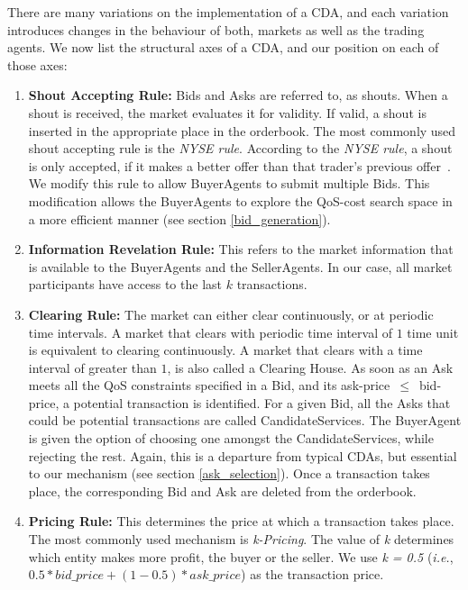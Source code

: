\documentclass[10pt,journal,compsoc]{IEEEtran}
\begin{document}
There are many variations on the implementation of a CDA, and each variation introduces changes in the behaviour of both, markets as well as the trading agents. We now list the structural axes of a CDA, and our position on each of those axes:
\begin{enumerate}
	\item \textbf{Shout Accepting Rule:} Bids and Asks are referred to, as shouts. When a shout is received, the market evaluates it for validity. If valid, a shout is inserted in the appropriate place in the orderbook. The most commonly used shout accepting rule is the \textit{NYSE rule}. According to the \textit{NYSE rule}, a shout is only accepted, if it makes a better offer than that trader's previous offer~\cite{Vytelingum2006Structure}. We modify this rule to allow BuyerAgents to submit multiple Bids. This modification allows the BuyerAgents to explore the QoS-cost search space in a more efficient manner (see section \ref{bid_generation}). 

	\item \textbf{Information Revelation Rule:} This refers to the market information that is available to the BuyerAgents and the SellerAgents. In our case, all market participants have access to the last $k$ transactions.	
	
	\item \textbf{Clearing Rule:} The market can either clear continuously, or at periodic time intervals. A market that clears with periodic time interval of $1$ time unit is equivalent to clearing continuously. A market that clears with a time interval of greater than $1$, is also called a Clearing House. As soon as an Ask meets all the QoS constraints specified in a Bid, and its ask-price~$\leq$~bid-price, a potential transaction is identified. For a given Bid, all the Asks that could be potential transactions are called CandidateServices. The BuyerAgent is given the option of choosing one amongst the CandidateServices, while rejecting the rest. Again, this is a departure from typical CDAs, but essential to our mechanism (see section \ref{ask_selection}). Once a transaction takes place, the corresponding Bid and Ask are deleted from the orderbook.
	
	\item \textbf{Pricing Rule:} This determines the price at which a transaction takes place. The most commonly used mechanism is \textit{k-Pricing}. The value of \textit{k} determines which entity makes more profit, the buyer or the seller. We use \textit{k = 0.5} (\textit{i.e.}, $0.5 * bid\_price + (1 - 0.5) * ask\_price$) as the transaction price. 	
	
\end{enumerate}
\end{document}
